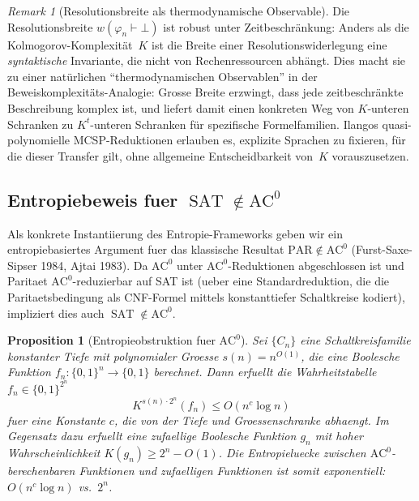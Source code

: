 \documentclass[aps,prd,twocolumn,superscriptaddress,nofootinbib]{revtex4-2}
\newtheorem{proposition}[theorem]{Proposition}
\theoremstyle{definition}
\theoremstyle{remark}
\newtheorem{remark}[theorem]{Remark}
\DeclareMathOperator{\SAT}{SAT}
\begin{document}
\begin{remark}[Resolutionsbreite als thermodynamische Observable]\label{rem:width-observable}
Die Resolutionsbreite $w(\varphi_n \vdash \bot)$ ist robust unter Zeitbeschr\"ankung: Anders als die Kolmogorov-Komplexit\"at~$K$ ist die Breite einer Resolutionswiderlegung eine \emph{syntaktische} Invariante, die nicht von Rechenressourcen abh\"angt. Dies macht sie zu einer nat\"urlichen "`thermodynamischen Observablen"' in der Beweiskomplexit\"ats-Analogie: Grosse Breite erzwingt, dass jede zeitbeschr\"ankte Beschreibung komplex ist, und liefert damit einen konkreten Weg von $K$-unteren Schranken zu $K^t$-unteren Schranken f\"ur spezifische Formelfamilien. Ilangos quasi-polynomielle MCSP-Reduktionen \cite{Ilango2026} erlauben es, explizite Sprachen zu fixieren, f\"ur die dieser Transfer gilt, ohne allgemeine Entscheidbarkeit von~$K$ vorauszusetzen.
\end{remark}

\subsection{Entropiebeweis fuer $\SAT \notin \mathrm{AC}^0$}
\label{sec:ac0}

Als konkrete Instantiierung des Entropie-Frameworks geben wir ein entropiebasiertes Argument fuer das klassische Resultat $\mathrm{PAR} \notin \mathrm{AC}^0$ (Furst-Saxe-Sipser 1984, Ajtai 1983). Da $\mathrm{AC}^0$ unter $\mathrm{AC}^0$-Reduktionen abgeschlossen ist und Paritaet $\mathrm{AC}^0$-reduzierbar auf SAT ist (ueber eine Standardreduktion, die die Paritaetsbedingung als CNF-Formel mittels konstanttiefer Schaltkreise kodiert), impliziert dies auch $\SAT \notin \mathrm{AC}^0$.

\begin{proposition}[Entropieobstruktion fuer $\mathrm{AC}^0$]
\label{prop:ac0}
Sei $\{C_n\}$ eine Schaltkreisfamilie konstanter Tiefe mit polynomialer Groesse $s(n) = n^{O(1)}$, die eine Boolesche Funktion $f_n: \{0,1\}^n \to \{0,1\}$ berechnet. Dann erfuellt die Wahrheitstabelle $f_n \in \{0,1\}^{2^n}$
\begin{equation}
K^{s(n) \cdot 2^n}(f_n) \leq O(n^c \log n)
\end{equation}
fuer eine Konstante $c$, die von der Tiefe und Groessenschranke abhaengt. Im Gegensatz dazu erfuellt eine \textit{zufaellige} Boolesche Funktion $g_n$ mit hoher Wahrscheinlichkeit $K(g_n) \geq 2^n - O(1)$. Die Entropieluecke zwischen $\mathrm{AC}^0$-berechenbaren Funktionen und zufaelligen Funktionen ist somit exponentiell: $O(n^c \log n)$ vs.\ $2^n$.
\end{proposition}
\end{document}
